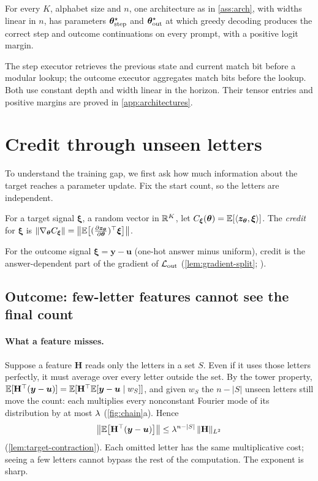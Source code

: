 \begin{proposition}
\label{prop:represent}
For every $K$, alphabet size and $n$, one architecture as in \cref{ass:arch}, with widths linear in $n$, has parameters
$\bm\theta^\star_{\mathrm{step}}$ and $\bm\theta^\star_{\mathrm{out}}$ at which greedy decoding produces the correct step and outcome continuations on every prompt, with
a positive logit margin.
\end{proposition}

The step executor retrieves the previous state and current match bit before a modular lookup;
the outcome executor aggregates match bits before the lookup. Both use constant depth and width
linear in the horizon. Their tensor entries and positive margins are proved in \cref{app:architectures}.

\section{Credit through unseen letters}
\label{sec:credit}

To understand the training gap, we first ask how much information about the target reaches a parameter update.
Fix the start count, so the letters are independent.

\begin{definition}[Credit]
\label{def:credit}
For a target signal $\bm\xi$, a random vector in $\mathbb R^K$, let $C_{\bm\xi}(\bm\theta)=\mathbb E[\langle\bm z_{\bm\theta},\bm\xi\rangle]$. The
\emph{credit} for $\bm\xi$ is $\|\nabla_{\bm\theta}\cred_{\bm\xi}\|=\bigl\|\E\bigl[(\Jz)^\top\bm\xi\bigr]\bigr\|$.
\end{definition}

For the outcome signal $\bm\xi=\bm y-\bm u$ (one-hot answer minus uniform), credit is the answer-dependent part of the gradient of
$\mathcal L_{\mathrm{out}}$ (\cref{lem:gradient-split}; \citealp{shalevshwartz2017failures,abbe2025parities}).

\subsection{Outcome: few-letter features cannot see the final count}
\paragraph{What a feature misses.} Suppose a feature $\mathbf H$ reads only the letters in a set $S$. Even if it uses those letters perfectly,
it must average over every letter outside the set. By the tower property,
$\mathbb E[\mathbf H^\top(\bm y-\bm u)]=\mathbb E[\mathbf H^\top\mathbb E[\bm y-\bm u\mid w_S]]$, and given $w_S$ the $n-|S|$ unseen letters still move the count: each
multiplies every nonconstant Fourier mode of its distribution by at most $\lambda$ (\cref{fig:chain}a). Hence
\begin{equation}
 \bigl\|\mathbb E\bigl[\mathbf H^\top(\bm y-\bm u)\bigr]\bigr\|\le\lambda^{n-|S|}\,\|\mathbf H\|_{L^2}
 \label{eq:credit-degree}
\end{equation}
(\cref{lem:target-contraction}). Each omitted letter has the same multiplicative cost; seeing a few letters cannot bypass the rest of
the computation. The exponent is sharp.

